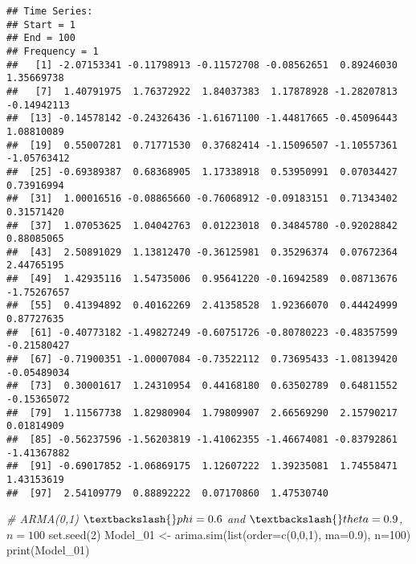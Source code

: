 \documentclass[
]{article}
\newenvironment{Shaded}{\begin{snugshade}}{\end{snugshade}}
\newcommand{\AttributeTok}[1]{\textcolor[rgb]{0.77,0.63,0.00}{#1}}
\newcommand{\CommentTok}[1]{\textcolor[rgb]{0.56,0.35,0.01}{\textit{#1}}}
\newcommand{\DecValTok}[1]{\textcolor[rgb]{0.00,0.00,0.81}{#1}}
\newcommand{\FloatTok}[1]{\textcolor[rgb]{0.00,0.00,0.81}{#1}}
\newcommand{\FunctionTok}[1]{\textcolor[rgb]{0.00,0.00,0.00}{#1}}
\newcommand{\NormalTok}[1]{#1}
\newcommand{\OtherTok}[1]{\textcolor[rgb]{0.56,0.35,0.01}{#1}}
\begin{document}
\begin{verbatim}
## Time Series:
## Start = 1 
## End = 100 
## Frequency = 1 
##   [1] -2.07153341 -0.11798913 -0.11572708 -0.08562651  0.89246030  1.35669738
##   [7]  1.40791975  1.76372922  1.84037383  1.17878928 -1.28207813 -0.14942113
##  [13] -0.14578142 -0.24326436 -1.61671100 -1.44817665 -0.45096443  1.08810089
##  [19]  0.55007281  0.71771530  0.37682414 -1.15096507 -1.10557361 -1.05763412
##  [25] -0.69389387  0.68368905  1.17338918  0.53950991  0.07034427  0.73916994
##  [31]  1.00016516 -0.08865660 -0.76068912 -0.09183151  0.71343402  0.31571420
##  [37]  1.07053625  1.04042763  0.01223018  0.34845780 -0.92028842  0.88085065
##  [43]  2.50891029  1.13812470 -0.36125981  0.35296374  0.07672364  2.44765195
##  [49]  1.42935116  1.54735006  0.95641220 -0.16942589  0.08713676 -1.75267657
##  [55]  0.41394892  0.40162269  2.41358528  1.92366070  0.44424999  0.87727635
##  [61] -0.40773182 -1.49827249 -0.60751726 -0.80780223 -0.48357599 -0.21580427
##  [67] -0.71900351 -1.00007084 -0.73522112  0.73695433 -1.08139420 -0.05489034
##  [73]  0.30001617  1.24310954  0.44168180  0.63502789  0.64811552 -0.15365072
##  [79]  1.11567738  1.82980904  1.79809907  2.66569290  2.15790217  0.01814909
##  [85] -0.56237596 -1.56203819 -1.41062355 -1.46674081 -0.83792861 -1.41367882
##  [91] -0.69017852 -1.06869175  1.12607222  1.39235081  1.74558471  1.43153619
##  [97]  2.54109779  0.88892222  0.07170860  1.47530740
\end{verbatim}

\begin{Shaded}
\begin{Highlighting}[]
\CommentTok{\# ARMA(0,1) $\textbackslash{}phi=0.6$ and $\textbackslash{}theta= 0.9$, $n=100$}
\FunctionTok{set.seed}\NormalTok{(}\DecValTok{2}\NormalTok{)}
\NormalTok{Model\_01 }\OtherTok{\textless{}{-}} \FunctionTok{arima.sim}\NormalTok{(}\FunctionTok{list}\NormalTok{(}\AttributeTok{order=}\FunctionTok{c}\NormalTok{(}\DecValTok{0}\NormalTok{,}\DecValTok{0}\NormalTok{,}\DecValTok{1}\NormalTok{), }\AttributeTok{ma=}\FloatTok{0.9}\NormalTok{), }\AttributeTok{n=}\DecValTok{100}\NormalTok{)}
\FunctionTok{print}\NormalTok{(Model\_01)}
\end{Highlighting}
\end{Shaded}
\end{document}
